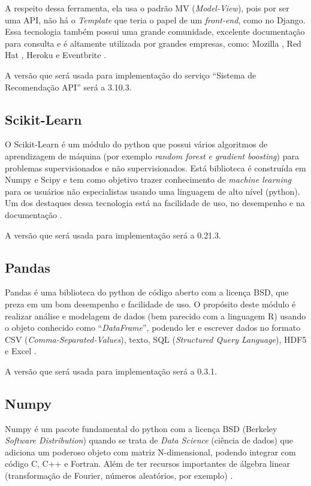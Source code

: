 A respeito dessa ferramenta, ela usa o padrão MV (\textit{Model-View}), pois por ser uma API, não há o \textit{Template} que teria o papel de um \textit{front-end}, como no Django. Essa tecnologia também possui uma grande comunidade, excelente documentação para consulta e é altamente utilizada por grandes empresas, como:  Mozilla , Red Hat , Heroku e Eventbrite \cite{DjangoRest:2019}.

A versão que será usada para implementação do serviço “Sistema de Recomendação API” será a 3.10.3.

\subsection{Scikit-Learn}

O Scikit-Learn é um módulo do python que possui vários algoritmos de aprendizagem de máquina (por exemplo \textit{random forest e gradient boosting}) para problemas supervisionados e não supervisionados. Está biblioteca é construída em Numpy e Scipy e tem como objetivo trazer conhecimento de \textit{machine learning} para os usuários não especialistas usando uma linguagem de alto nível (python). Um dos destaques dessa tecnologia está na facilidade de uso, no desempenho e na documentação \cite{PREDEGOSA:2011}.

A versão que será usada para implementação será a 0.21.3.

\subsection{Pandas}

Pandas é uma biblioteca do python de código aberto com a licença BSD, que preza em um bom desempenho e facilidade de uso. O propósito deste módulo é realizar análise e modelagem de dados (bem parecido com a linguagem R) usando o objeto conhecido como “\textit{DataFrame}”, podendo ler e escrever dados no formato CSV (\textit{Comma-Separated-Values}), texto, SQL (\textit{Structured Query Language}), HDF5 e Excel \cite{pandas:2019}.

A versão que será usada para implementação será a 0.3.1.

\subsection{Numpy}

Numpy é um pacote fundamental do python com a licença BSD (Berkeley \textit{Software Distribution}) quando se trata de \textit{Data Science} (ciência de dados) que adiciona um poderoso objeto com matriz N-dimensional, podendo integrar com código C, C++ e Fortran. Além de ter recursos importantes de álgebra linear (transformação de Fourier, números aleatórios, por exemplo) \cite{numpy:2019}.

